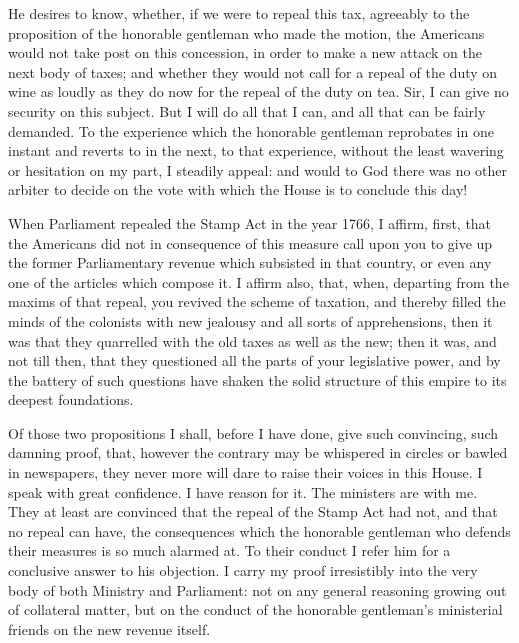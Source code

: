 He desires to know, whether, if we were to repeal this tax, agreeably to the proposition of the honorable gentleman who made the motion, the Americans would not take post on this concession, in order to make a new attack on the next body of taxes; and whether they would not call for a repeal of the duty on wine as loudly as they do now for the repeal of the duty on tea. Sir, I can give no security on this subject. But I will do all that I can, and all that can be fairly demanded. To the experience which the honorable gentleman reprobates in one instant and reverts to in the next, to that experience, without the least wavering or hesitation on my part, I steadily appeal: and would to God there was no other arbiter to decide on the vote with which the House is to conclude this day!

When Parliament repealed the Stamp Act in the year 1766, I affirm, first, that the Americans did not in consequence of this measure call upon you to give up the former Parliamentary revenue which subsisted in that country, or even any one of the articles which compose it. I affirm also, that, when, departing from the maxims of that repeal, you revived the scheme of taxation, and thereby filled the minds of the colonists with new jealousy and all sorts of apprehensions, then it was that they quarrelled with the old taxes as well as the new; then it was, and not till then, that they questioned all the parts of your legislative power, and by the battery of such questions have shaken the solid structure of this empire to its deepest foundations.

Of those two propositions I shall, before I have done, give such convincing, such damning proof, that, however the contrary may be whispered in circles or bawled in newspapers, they never more will dare to raise their voices in this House. I speak with great confidence. I have reason for it. The ministers are with me. They at least are convinced that the repeal of the Stamp Act had not, and that no repeal can have, the consequences which the honorable gentleman who defends their measures is so much alarmed at. To their conduct I refer him for a conclusive answer to his objection. I carry my proof irresistibly into the very body of both Ministry and Parliament: not on any general reasoning growing out of collateral matter, but on the conduct of the honorable gentleman's ministerial friends on the new revenue itself.

